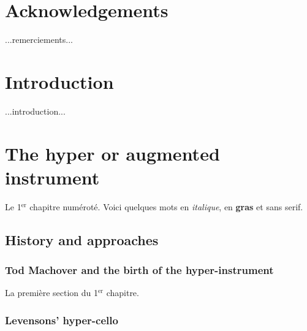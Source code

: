 \documentclass[12pt,twoside,maitrise]{dms}
\theoremstyle{definition}
\numberwithin{equation}{section}
\numberwithin{table}{chapter}
\numberwithin{figure}{chapter}
\begin{document}

\chapter*{Acknowledgements}

...remerciements...


\NoChapterPageNumber
\cleardoublepage


\chapter*{Introduction}

...introduction...


\chapter{The hyper or augmented instrument}

Le 1$^{\text{er}}$ chapitre numéroté. Voici quelques mots en \emph{italique}, en \textbf{gras} et \textsf{sans serif}.

\section{History and approaches}

\subsection{Tod Machover and the birth of the hyper-instrument}

La premi\`ere section du 1$^{\text{er}}$ chapitre.

\subsection{Levensons' hyper-cello}
\end{document}
